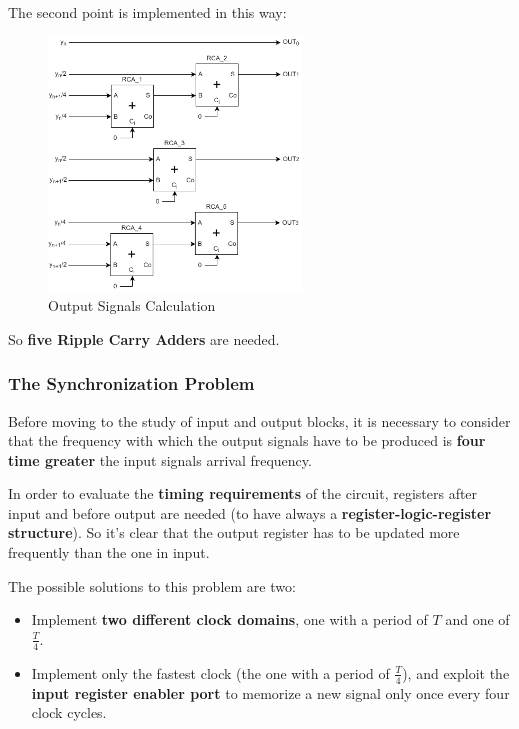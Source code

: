 \newpage

The second point is implemented in this way:

\begin{figure}[H]
    \centering
    \includegraphics[width=0.6\textwidth]{img/Chapter2/CombinationalStructure.png}
    \caption{Output Signals Calculation}
    \label{fig:OutputSignalsCalc}
\end{figure}

So \textbf{five Ripple Carry Adders} are needed.

\subsubsection{The Synchronization Problem}

Before moving to the study of input and output blocks, it is necessary to consider that the frequency with which the output signals have to be produced is \textbf{four time greater} the input signals arrival frequency.

In order to evaluate the \textbf{timing requirements} of the circuit, registers after input and before output are needed (to have always a \textbf{register-logic-register structure}). So it's clear that the output register has to be updated more frequently than the one in input.

The possible solutions to this problem are two:

\begin{itemize}
    \item Implement \textbf{two different clock domains}, one with a period of $T$ and one of $\frac{T}{4}$.
    \item Implement only the fastest clock (the one with a period of $\frac{T}{4}$), and exploit the \textbf{input register enabler port} to memorize a new signal only once every four clock cycles.  
\end{itemize}

